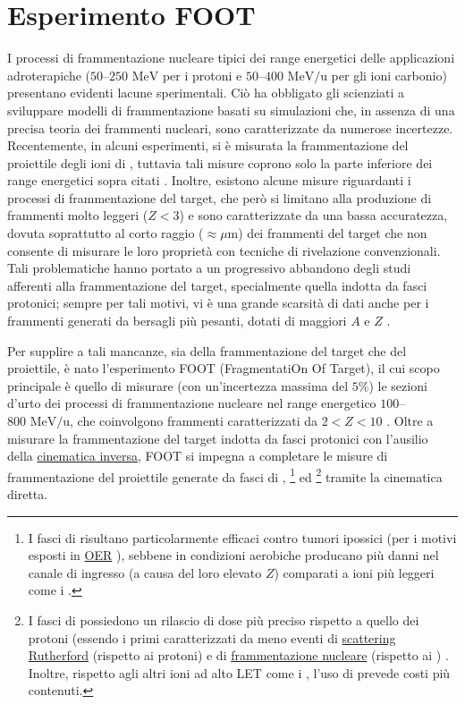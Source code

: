 \documentclass[12pt,a4paper,twoside]{report}
\begin{document}
	\chapter{Esperimento FOOT}\label{cap:2}
	I processi di frammentazione nucleare tipici dei range energetici delle applicazioni adroterapiche ($50$--$250\mbox{ MeV}$ per i protoni e $50$--$400\mbox{ MeV/u}$ per gli ioni carbonio) presentano evidenti lacune sperimentali. Ciò ha obbligato gli scienziati a sviluppare modelli di frammentazione basati su simulazioni che, in assenza di una precisa teoria dei frammenti nucleari, sono caratterizzate da numerose incertezze. Recentemente, in alcuni esperimenti, si è misurata la frammentazione del proiettile degli ioni di , tuttavia tali misure coprono solo la parte inferiore dei range energetici sopra citati \cite{PhysRevC.88.024606,PhysRevC.93.064601}. Inoltre, esistono alcune misure riguardanti i processi di frammentazione del target, che però si limitano alla produzione di frammenti molto leggeri ($Z<3$) e sono caratterizzate da una bassa accuratezza, dovuta soprattutto al corto raggio ($\approx\mu\mbox{m}$) dei frammenti del target che non consente di misurare le loro proprietà con tecniche di rivelazione convenzionali. Tali problematiche hanno portato a un progressivo abbandono degli studi afferenti alla frammentazione del target, specialmente quella indotta da fasci protonici; sempre per tali motivi, vi è una grande scarsità di dati anche per i frammenti generati da bersagli più pesanti, dotati di maggiori $A$ e $Z$ \cite{foot_cdr}.
	
	Per supplire a tali mancanze, sia della frammentazione del target che del proiettile, è nato l'esperimento FOOT (FragmentatiOn Of Target), il cui scopo principale è quello di misurare (con un'incertezza massima del $5\%$) le sezioni d'urto dei processi di frammentazione nucleare nel range energetico $100$--$800\mbox{ MeV/u}$, che coinvolgono frammenti caratterizzati da $2<Z<10$ \cite{ubaldiArticle}. Oltre a misurare la frammentazione del target indotta da fasci protonici con l'ausilio della \hyperref[sec:cinematica_inversa]{cinematica inversa}, FOOT si impegna a completare le misure di frammentazione del proiettile generate da fasci di , \footnote{I fasci di  risultano particolarmente efficaci contro tumori ipossici (per i motivi esposti in \hyperref[par:oer]{OER} \cite{Tommasino2016-qb}), sebbene in condizioni aerobiche producano più danni nel canale di ingresso (a causa del loro elevato $Z$) comparati a ioni più leggeri come i .} ed \footnote{I fasci di  possiedono un rilascio di dose più preciso rispetto a quello dei protoni (essendo i primi caratterizzati da meno eventi di \hyperref[par:scattering_Rutherford]{scattering Rutherford} (rispetto ai protoni) e di \hyperref[par:interazioni_nucleari]{frammentazione nucleare} (rispetto ai ) \cite{Grun2015-ln,articleIndelicato}. Inoltre, rispetto agli altri ioni ad alto LET come i , l'uso di  prevede costi più contenuti.} tramite la cinematica diretta.
		
\end{document}
